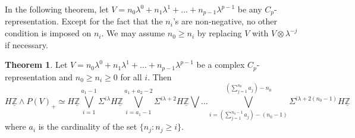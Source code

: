 \documentclass[a4paper,leqno,11pt]{amsart}
\theoremstyle{plain}
\theoremstyle{definition}
\newtheorem{thm}[theorem]{Theorem}
\theoremstyle{remark}
\theoremstyle{definition}
\newcommand{\uZ}{\underline{\mathbb{Z}}}
\def\lam{\lambda}
\numberwithin{equation}{section}
\newcommand{\smas}{\wedge}
\begin{document}
	\vspace{.5cm}
	
	In the following theorem, let $V =  n_0\lambda^0 + n_1\lambda^1 + \dots + n_{p-1}\lambda^{p-1} $ be any $C_p$-representation. Except for the fact that the $n_i$'s are non-negative, no other condition is imposed on $n_{i}$. We may assume $n_{0}\geq n_{i}$ by replacing $V$ with $V\otimes\lam^{-j}$ if necessary. 
	
	\begin{thm}\label{thm V with uneven coeff}
		Let $V=  n_0\lambda^0 + n_1\lambda^1 + \dots + n_{p-1}\lambda^{p-1}$ be a complex $C_p$-representation and $n_0\geq n_i\geq 0$  for all $ i $. Then 
		$$H\uZ\smas P(V)_+ \simeq H\uZ\bigvee_{i=1}^{a_1-1}\Sigma^{i\lambda} H\uZ\bigvee_{i=a_1-1}^{a_1+a_2-2} \Sigma^{i\lambda+2}H\uZ\bigvee \dots \bigvee_{i=(\sum_{j=1}^{n_0-1}a_{j})- (n_0 - 1)}^{(\sum_{j=1}^{n_0}a_{j})- n_0 } \Sigma^{i\lambda + 2(n_0-1)}H\uZ$$ 
		where  $a_i$ is the cardinality of the set $\{ n_j: n_j\geq i\} $.
	\end{thm}
	
\end{document}
